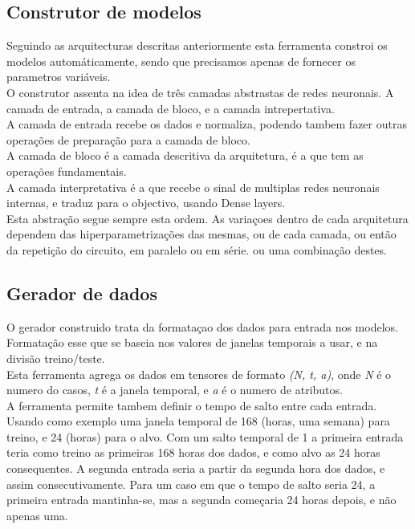 \subsection{Construtor de modelos}

Seguindo as arquitecturas descritas anteriormente esta ferramenta constroi os modelos automáticamente, sendo que precisamos apenas de fornecer os parametros variáveis.\\
O construtor assenta na idea de três camadas abstrastas de redes neuronais. A camada de entrada, a camada de bloco, e a camada intrepertativa.\\
A camada de entrada recebe os dados e normaliza, podendo tambem fazer outras operações de preparação para a camada de bloco.\\
A camada de bloco é a camada descritiva da arquitetura, é a que tem as operações fundamentais.\\
A camada interpretativa é a que recebe o sinal de multiplas redes neuronais internas, e traduz para o objectivo, usando Dense layers. \\

Esta abstração segue sempre esta ordem. As variaçoes dentro de cada arquitetura dependem das hiperparametrizações das mesmas, ou de cada camada, ou então da repetição do circuito, em paralelo ou em série. ou uma combinação destes.\\

\subsection{Gerador de dados}

O gerador construido trata da formataçao dos dados para entrada nos modelos. Formatação esse que se baseia nos valores de janelas temporais a usar, e na divisão treino/teste.\\
Esta ferramenta agrega os dados em tensores de formato \textit{(N, t, a)}, onde \textit{N} é o numero do casos, \textit{t} é a janela temporal, e \textit{a} é o numero de atributos.\\
A ferramenta permite tambem definir o tempo de salto entre cada entrada.\\
Usando como exemplo uma janela temporal de 168 (horas, uma semana) para treino, e 24 (horas) para o alvo. Com um salto temporal de 1 a primeira entrada teria como treino as primeiras 168 horas dos dados, e como alvo as 24 horas consequentes. A segunda entrada seria a partir da segunda hora dos dados, e assim consecutivamente. Para um caso em que o tempo de salto seria 24, a primeira entrada mantinha-se, mas a segunda começaria 24 horas depois, e não apenas uma.\\

